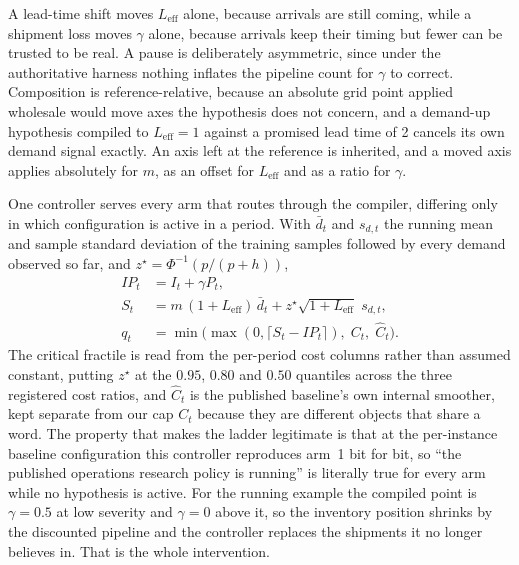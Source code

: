 A lead-time shift moves $L_{\mathrm{eff}}$ alone, because arrivals are still
coming, while a shipment loss moves $\gamma$ alone, because arrivals keep their
timing but fewer can be trusted to be real. A pause is deliberately asymmetric,
since under the authoritative harness nothing inflates the pipeline count for
$\gamma$ to correct. Composition is reference-relative, because an absolute grid
point applied wholesale would move axes the hypothesis does not concern, and a
demand-up hypothesis compiled to $L_{\mathrm{eff}} = 1$ against a promised lead
time of 2 cancels its own demand signal exactly. An axis left at the reference is
inherited, and a moved axis applies absolutely for $m$, as an offset for
$L_{\mathrm{eff}}$ and as a ratio for $\gamma$.

One controller serves every arm that routes through the compiler, differing only
in which configuration is active in a period. With $\bar{d}_t$ and $s_{d,t}$ the
running mean and sample standard deviation of the training samples followed by
every demand observed so far, and $z^\star = \Phi^{-1}(p/(p+h))$,
\begin{align}
IP_t &= I_t + \gamma P_t, \\
S_t  &= m\,(1 + L_{\mathrm{eff}})\,\bar{d}_t
        + z^\star \sqrt{1 + L_{\mathrm{eff}}}\; s_{d,t}, \\
q_t  &= \min\bigl(\max(0, \lceil S_t - IP_t \rceil),\; C_t,\; \hat{C}_t\bigr).
\end{align}
The critical fractile is read from the per-period cost columns rather than
assumed constant, putting $z^\star$ at the $0.95$, $0.80$ and $0.50$ quantiles
across the three registered cost ratios, and $\hat{C}_t$ is the published
baseline's own internal smoother, kept separate from our cap $C_t$ because they
are different objects that share a word. The property that makes the ladder
legitimate is that at the per-instance baseline configuration this controller
reproduces arm~1 bit for bit, so ``the published operations research policy is
running'' is literally true for every arm while no hypothesis is active. For the
running example the compiled point is $\gamma = 0.5$ at low severity and
$\gamma = 0$ above it, so the inventory position shrinks by the discounted
pipeline and the controller replaces the shipments it no longer believes in. That
is the whole intervention.
